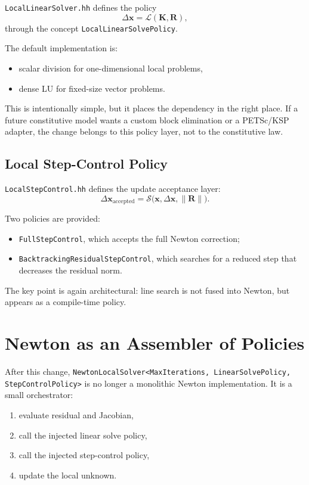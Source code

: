 \texttt{LocalLinearSolver.hh} defines the policy
\[
  \Delta\mathbf{x} = \mathcal{L}(\mathbf{K}, \mathbf{R}),
\]
through the concept \texttt{LocalLinearSolvePolicy}.

The default implementation is:
\begin{itemize}
  \item scalar division for one-dimensional local problems,
  \item dense LU for fixed-size vector problems.
\end{itemize}

This is intentionally simple, but it places the dependency in the right place.
If a future constitutive model wants a custom block elimination or a PETSc/KSP
adapter, the change belongs to this policy layer, not to the constitutive law.

\subsection{Local Step-Control Policy}

\texttt{LocalStepControl.hh} defines the update acceptance layer:
\[
  \Delta\mathbf{x}_{\text{accepted}}
  = \mathcal{S}\bigl(\mathbf{x}, \Delta\mathbf{x}, \|\mathbf{R}\|\bigr).
\]

Two policies are provided:
\begin{itemize}
  \item \texttt{FullStepControl}, which accepts the full Newton correction;
  \item \texttt{BacktrackingResidualStepControl}, which searches for a reduced
        step that decreases the residual norm.
\end{itemize}

The key point is again architectural: line search is not fused into Newton, but
appears as a compile-time policy.

\section{Newton as an Assembler of Policies}

After this change,
\texttt{NewtonLocalSolver<MaxIterations, LinearSolvePolicy, StepControlPolicy>}
is no longer a monolithic Newton implementation.  It is a small orchestrator:
\begin{enumerate}
  \item evaluate residual and Jacobian,
  \item call the injected linear solve policy,
  \item call the injected step-control policy,
  \item update the local unknown.
\end{enumerate}


